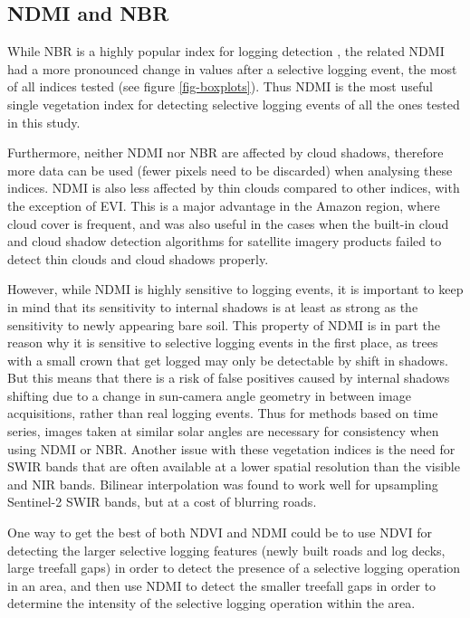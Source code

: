 \documentclass[a4paper,12pt]{scrbook}
\begin{document}
\subsection{NDMI and NBR}

While \ac{NBR} is a highly popular index for logging detection \citep{shimizu_using_2017, schneibel_assessment_2017}, the related \ac{NDMI} had a more pronounced change in values after a selective logging event, the most of all indices tested (see figure \ref{fig-boxplots}). Thus \ac{NDMI} is the most useful single vegetation index for detecting selective logging events of all the ones tested in this study.

Furthermore, neither \ac{NDMI} nor \ac{NBR} are affected by cloud shadows, therefore more data can be used (fewer pixels need to be discarded) when analysing these indices. \ac{NDMI} is also less affected by thin clouds compared to other indices, with the exception of \ac{EVI}. This is a major advantage in the Amazon region, where cloud cover is frequent, and was also useful in the cases when the built-in cloud and cloud shadow detection algorithms for satellite imagery products failed to detect thin clouds and cloud shadows properly.

However, while \ac{NDMI} is highly sensitive to logging events, it is important to keep in mind that its sensitivity to internal shadows is at least as strong as the sensitivity to newly appearing bare soil. This property of \ac{NDMI} is in part the reason why it is sensitive to selective logging events in the first place, as trees with a small crown that get logged may only be detectable by shift in shadows. But this means that there is a risk of false positives caused by internal shadows shifting due to a change in sun-camera angle geometry in between image acquisitions, rather than real logging events. Thus for methods based on time series, images taken at similar solar angles are necessary for consistency when using \ac{NDMI} or \ac{NBR}. Another issue with these vegetation indices is the need for \ac{SWIR} bands that are often available at a lower spatial resolution than the visible and \ac{NIR} bands. Bilinear interpolation was found to work well for upsampling Sentinel-2 \ac{SWIR} bands, but at a cost of blurring roads.

One way to get the best of both \ac{NDVI} and \ac{NDMI} could be to use \ac{NDVI} for detecting the larger selective logging features (newly built roads and log decks, large treefall gaps) in order to detect the presence of a selective logging operation in an area, and then use \ac{NDMI} to detect the smaller treefall gaps in order to determine the intensity of the selective logging operation within the area.
\end{document}
